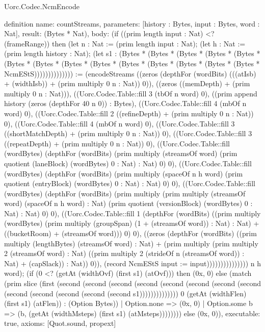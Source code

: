 \begin{lexlean}{Uorc.Codec.NcmEncode}
\begin{semanticmodule}
definition{
  name: countStreams,
  parameters: [history : Bytes, input : Bytes, word : Nat],
  result: (Bytes * Nat),
  body: (if ((prim length input : Nat) <? (frameRange)) then (let n : Nat := (prim length input : Nat); (let h : Nat := (prim length history : Nat); (let s1 : (Bytes * (Bytes * (Bytes * (Bytes * (Bytes * (Bytes * (Bytes * (Bytes * (Bytes * (Bytes * (Bytes * (Bytes * (Bytes * (Bytes * NcmEStS)))))))))))))) := (encodeStreams ((zeros (depthFor (wordBits) (((atIsb) + (widthIsb)) + (prim multiply 0 n : Nat)) 0)), ((zeros ((memDepth) + (prim multiply 0 n : Nat))), ((Uorc.Codec.Table::fill 3 (tbOf n word) 0), ((prim append history (zeros (depthFor 40 n 0)) : Bytes), ((Uorc.Codec.Table::fill 4 (mbOf n word) 0), ((Uorc.Codec.Table::fill 2 ((refineDepth) + (prim multiply 0 n : Nat)) 0), ((Uorc.Codec.Table::fill 4 (mbOf n word) 0), ((Uorc.Codec.Table::fill 3 ((shortMatchDepth) + (prim multiply 0 n : Nat)) 0), ((Uorc.Codec.Table::fill 3 ((repeatDepth) + (prim multiply 0 n : Nat)) 0), ((Uorc.Codec.Table::fill (wordBytes) (depthFor (wordBits) (prim multiply (streamsOf word) (prim quotient (laneBlock) (wordBytes) 0 : Nat) : Nat) 0) 0), ((Uorc.Codec.Table::fill (wordBytes) (depthFor (wordBits) (prim multiply (spaceOf n h word) (prim quotient (entryBlock) (wordBytes) 0 : Nat) : Nat) 0) 0), ((Uorc.Codec.Table::fill (wordBytes) (depthFor (wordBits) (prim multiply (prim multiply (streamsOf word) (spaceOf n h word) : Nat) (prim quotient (versionBlock) (wordBytes) 0 : Nat) : Nat) 0) 0), ((Uorc.Codec.Table::fill 1 (depthFor (wordBits) ((prim multiply (wordBytes) (prim multiply (groupSpan) (1 + (streamsOf word)) : Nat) : Nat) + ((bucketRoom) + (streamsOf word))) 0) 0), ((zeros (depthFor (wordBits) ((prim multiply (lengthBytes) (streamsOf word) : Nat) + (prim multiply (prim multiply 2 (streamsOf word) : Nat) ((prim multiply 2 (strideOf n (streamsOf word)) : Nat) + (capSlack)) : Nat)) 0)), (record NcmEStS {input := input}))))))))))))))) n h word); (if (0 <? (getAt (widthOvf) (first s1) (atOvf))) then (0x, 0) else (match (prim slice (first (second (second (second (second (second (second (second (second (second (second (second (second (second s1)))))))))))))) 0 (getAt (widthFlen) (first s1) (atFlen)) : (Option Bytes))
    | Option.none => (0x, 0)
    | Option.some b => (b, (getAt (widthMsteps) (first s1) (atMsteps)))))))) else (0x, 0)),
  executable: true,
  axioms: [Quot.sound, propext]
}
\end{semanticmodule}
\end{lexlean}
